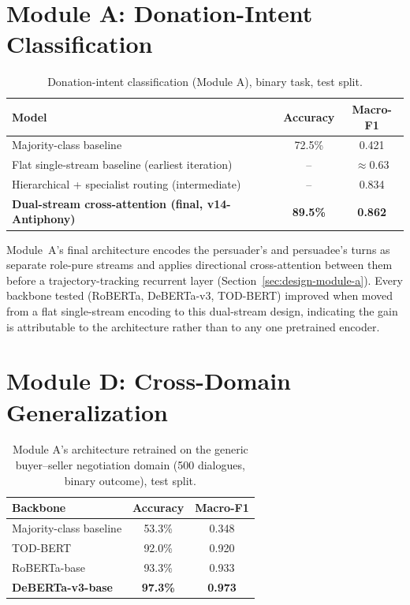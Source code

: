 \section{Module A: Donation-Intent Classification}
\label{sec:module-a-results}

\begin{table}[H]
\centering
\caption{Donation-intent classification (Module A), binary task, test split.}
\label{tab:module-a}
\begin{tabular}{@{}lcc@{}}
\toprule
\textbf{Model} & \textbf{Accuracy} & \textbf{Macro-F1} \\
\midrule
Majority-class baseline & 72.5\% & 0.421 \\
Flat single-stream baseline (earliest iteration) & -- & $\approx$0.63 \\
Hierarchical + specialist routing (intermediate) & -- & 0.834 \\
\textbf{Dual-stream cross-attention (final, v14-Antiphony)} & \textbf{89.5\%} & \textbf{0.862} \\
\bottomrule
\end{tabular}
\end{table}

Module~A's final architecture encodes the persuader's and persuadee's turns
as separate role-pure streams and applies directional cross-attention
between them before a trajectory-tracking recurrent layer
(Section~\ref{sec:design-module-a}). Every backbone tested (RoBERTa,
DeBERTa-v3, TOD-BERT) improved when moved from a flat single-stream encoding
to this dual-stream design, indicating the gain is attributable to the
architecture rather than to any one pretrained encoder.

\section{Module D: Cross-Domain Generalization}
\label{sec:generic-results}

\begin{table}[H]
\centering
\caption{Module A's architecture retrained on the generic buyer--seller negotiation domain
(500 dialogues, binary outcome), test split.}
\label{tab:generic}
\begin{tabular}{@{}lcc@{}}
\toprule
\textbf{Backbone} & \textbf{Accuracy} & \textbf{Macro-F1} \\
\midrule
Majority-class baseline & 53.3\% & 0.348 \\
TOD-BERT & 92.0\% & 0.920 \\
RoBERTa-base & 93.3\% & 0.933 \\
\textbf{DeBERTa-v3-base} & \textbf{97.3\%} & \textbf{0.973} \\
\bottomrule
\end{tabular}
\end{table}

